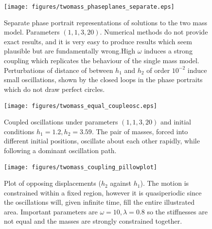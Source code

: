 \documentclass{report}
\begin{document}
\begin{figure}[h]
    \centering
    \texttt{[image: figures/twomass\_phaseplanes\_separate.eps]}
    \caption{
        Separate phase portrait representations of solutions to the two mass model.
        Parameters \((1,1,3,20)\). Numerical methods do not provide exact results,
        and it is very easy to produce results which seem plausible but are fundamentally wrong.High $\omega$ induces a strong coupling which replicates the behaviour of the single mass model.
        Perturbations of distance of between $h_1$ and $h_2$ of order $10^{-2}$ induce small oscillations,
        shown by the closed loops in the phase portraits which do not draw perfect circles.
    }
    \label{fig:twomass_phaseportrait_replicated}
\end{figure}

\begin{figure}[h]
    \centering
    \texttt{[image: figures/twomass\_equal\_coupleosc.eps]}
    \caption{Coupled oscillations under parameters \((1, 1, 3, 20)\) and initial conditions \(h_1 = 1.2, h_2 = 3.59\).
    The pair of masses, forced into different initial positions,
    oscillate about each other rapidly, while following a dominant oscillation path.}
    \label{fig:twomass_dominant_osc}
\end{figure}

\begin{figure}[h]
    \centering
    \texttt{[image: figures/twomass\_coupling\_pillowplot]}
    \caption{
        Plot of opposing displacements ($h_2$ against $h_1$). The motion is constrained within a fixed region,
        however it is quasiperiodic since the oscillations will, given infinite time, fill the entire illustrated area.
        Important parameters are \(\omega = 10, \lambda = 0.8\) so the stiffnesses are not equal and the masses are strongly constrained together.
    }
    \label{fig:twomass_quasiperiodic}
\end{figure} %
\end{document}
